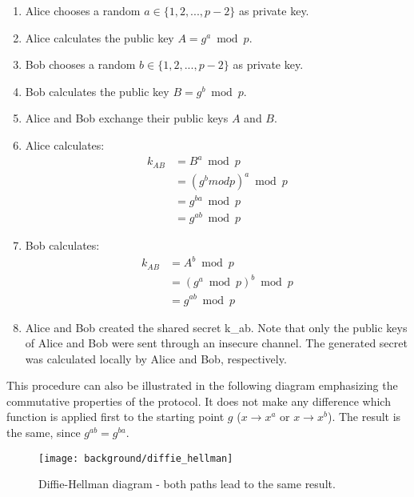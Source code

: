 \begin{enumerate}
	\item Alice chooses a random $a \in \{1, 2, ... , p-2\}$ as private key. 
	\item Alice calculates the public key $A = g^a\bmod p$.
	\item Bob chooses a random $b \in \{1, 2, ... , p-2\}$ as private key. 
	\item Bob calculates the public key $B = g^b\bmod p$.
	\item Alice and Bob exchange their public keys $A$ and $B$.
	\item Alice calculates: 
	      \begin{equation}
	      	\begin{split}
	      		k_{AB} & = B^a\bmod p \\
	      		& = (g^b mod p)^a\bmod p \\
	      		& = g^{b a}\bmod p \\
	      		& = g^{a b}\bmod p
	      	\end{split}
	      \end{equation}
	\item Bob calculates: 
	      \begin{equation}
	      	\begin{split}
	      		k_{AB} & = A^b\bmod p \\
	      		& = (g^a\bmod p)^b\bmod p \\
	      		& = g^{a b}\bmod p
	      	\end{split}
	      \end{equation}
	\item Alice and Bob created the shared secret \gls{k_ab}. Note that only the public keys of Alice and Bob were sent through an insecure channel. The generated secret was calculated locally by Alice and Bob, respectively.
\end{enumerate}

This procedure can also be illustrated in the following diagram emphasizing the commutative properties of the protocol. It does not make any difference which function is applied first to the starting point $g$ ($x \to x^a$ or $x \to x^b$). The result is the same, since $g^{ab} = g^{ba}$.

\begin{figure}[htpb]
  \centering
  \texttt{[image: background/diffie\_hellman]}
  \caption[Diffie-Hellman diagram]{Diffie-Hellman diagram - both paths lead to the same result.}
  \label{fig:diffie_hellman}
\end{figure}

